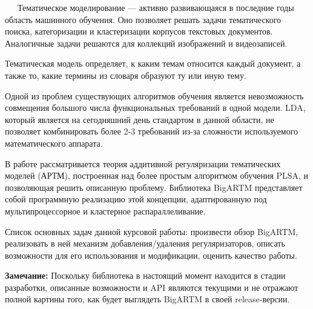 
$\quad\;\:$Тематическое моделирование --- активно развивающаяся в последние годы область машинного обучения. Оно позволяет решать задачи тематического поиска, категоризации и кластеризации корпусов текстовых документов. Аналогичные задачи решаются для коллекций изображений и видеозаписей.

Тематическая модель определяет, к каким темам относится каждый документ, а также то, какие термины из словаря образуют ту или иную тему.

Одной из проблем существующих алгоритмов обучения является невозможность совмещения большого числа функциональных требований в одной модели. LDA, который является на сегодняшний день стандартом в данной области, не позволяет комбинировать более 2-3 требований из-за сложности используемого математического аппарата.

В работе \cite{voron2013ptm} рассматривается теория аддитивной регуляризации тематических моделей (АРТМ), построенная над более простым алгоритмом обучения PLSA, и позволяющая решить описанную проблему. Библиотека BigARTM представляет собой программную реализацию этой концепции, адаптированную под мультипроцессорное и кластерное распараллеливание.

Список основных задач данной курсовой работы: произвести обзор BigARTM, реализовать в ней  механизм добавления/удаления регуляризаторов, описать возможности для его использования и модификации, оценить качество работы. 

{\bf Замечание:} Поскольку библиотека в настоящий момент находится в стадии разработки, описанные возможности и API являются текущими и не отражают полной картины того, как будет выглядеть BigARTM в своей release-версии.
